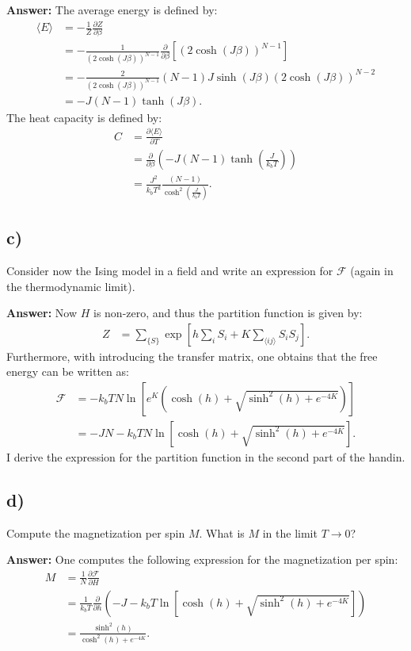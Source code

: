 \documentclass[a4paper]{article}
\newcommand{\newparagraph}{\vspace{.5cm}\noindent}
\newcommand{\fpartial}[2]{\frac{\partial #1}{\partial #2}}
\newcommand{\average}[1]{\langle #1 \rangle}
\begin{document}
\newparagraph
\textbf{Answer:} The average energy is defined by:
\begin{align*}
    \average{E} &= -\frac{1}{Z}\fpartial{Z}{\beta}\\
    &=-\frac{1}{\left(2\cosh(J\beta)\right)^{N-1}}\frac{\partial}{\partial \beta}\left[\left(2\cosh(J\beta)\right)^{N-1}\right]\\
    &= -\frac{2}{\left(2\cosh(J\beta)\right)^{N-1}}\left(N-1\right)J\sinh(J\beta)\left(2\cosh(J\beta)\right)^{N-2}\\
    &= -J\left(N-1\right)\tanh(J\beta).
\end{align*}The heat capacity is defined by:
\begin{align*}
    C &= \fpartial{\average{E}}{T}\\
    &= \fpartial{}{\beta}\left(-J\left(N-1\right)\tanh\left(\frac{J}{k_bT}\right)\right)\\
    &= \frac{J^2}{k_bT^2}\frac{(N-1)}{\cosh^2\left(\frac{J}{k_bT}\right)}.
\end{align*}

\subsection*{c)}
Consider now the Ising model in a field and write an expression for $\mathcal{F}$ (again in the thermodynamic limit).

\newparagraph
\textbf{Answer:} Now $H$ is non-zero, and thus the partition function is given by:
\begin{align*}
    Z &= \sum_{\{S\}}\exp\left[h\sum_i S_i + K\sum_{\average{ij}}S_iS_j\right].
\end{align*}Furthermore, with introducing the transfer matrix, one obtains that the free energy can be written as:
\begin{align*}
    \mathcal{F} &= -k_bTN\ln\left[e^{K}\left(\cosh(h) + \sqrt{\sinh^2(h) + e^{-4K}}\right)\right]\\
    &= -JN - k_bTN\ln\left[\cosh(h) + \sqrt{\sinh^2(h) + e^{-4K}}\right].
\end{align*}I derive the expression for the partition function in the second part of the handin.

\subsection*{d)}
Compute the magnetization per spin $M$. What is $M$ in the limit $T\to0$?

\newparagraph
\textbf{Answer:} One computes the following expression for the magnetization per spin:
\begin{align*}
    M &= \frac{1}{N}\fpartial{\mathcal{F}}{H}\\
    &= \frac{1}{k_bT}\fpartial{}{h}\left(- J - k_bT\ln\left[\cosh(h) + \sqrt{\sinh^2(h) + e^{-4K}}\right]\right)\\
    &= \frac{\sinh^2(h)}{\cosh^2(h) + e^{-4K}}.
\end{align*}
\end{document}
